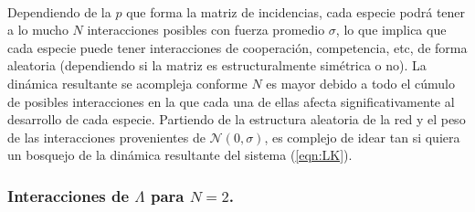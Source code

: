 \\
Dependiendo de la $p$ que forma la matriz de incidencias, cada especie podrá tener a lo mucho $N$ interacciones posibles con fuerza promedio $\sigma$, lo que implica que cada especie puede tener interacciones de cooperación, competencia, etc, de forma aleatoria (dependiendo si la matriz es estructuralmente simétrica o no). La dinámica resultante se acompleja conforme $N$ es mayor debido a todo el cúmulo de posibles interacciones en la que cada una de ellas afecta significativamente al desarrollo de cada especie. Partiendo de la estructura aleatoria de la red y el peso de las interacciones provenientes de $\mathcal{N}(0,\sigma)$, es complejo de idear tan si quiera un bosquejo de la dinámica resultante del sistema (\ref{eqn:LK}).

\subsubsection*{Interacciones de $\Lambda$ para $N=2$.}


